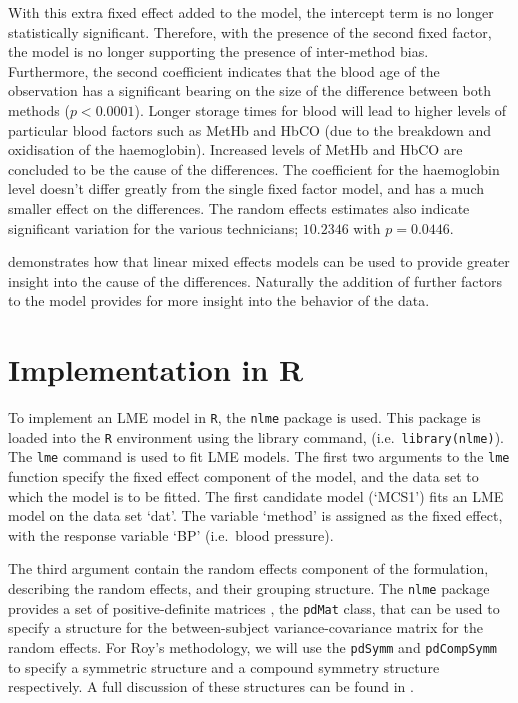 \documentclass[12pt, a4paper]{report}
\theoremstyle{plain}
\theoremstyle{definition}
\theoremstyle{remark}
\begin{document}
With this extra fixed effect added to the model, the intercept
term is no longer statistically significant. Therefore, with the
presence of the second fixed factor, the model is no longer
supporting the presence of inter-method bias. Furthermore, the
second coefficient indicates that the blood age of the observation
has a significant bearing on the size of the difference between
both methods ($p <0.0001$). Longer storage times for blood will
lead to higher levels of particular blood factors such as MetHb
and HbCO (due to the breakdown and oxidisation of the
haemoglobin). Increased levels of MetHb and HbCO are concluded to
be the cause of the differences. The coefficient for the
haemoglobin level doesn't differ greatly from the single fixed
factor model, and has a much smaller effect on the differences.
The random effects estimates also indicate significant variation
for the various technicians; $10.2346$ with $p=0.0446$.

\citet{LaiShiao} demonstrates how that linear mixed effects models
can be used to provide greater insight into the cause of the
differences. Naturally the addition of further factors to the
model provides for more insight into the behavior of the data.






\section{Implementation in R}
To implement an LME model in \texttt{R}, the \texttt{nlme} package is used. This package is loaded into the \texttt{R} environment using the library command, (i.e.\ \texttt{library(nlme)}). The \texttt{lme} command is used to fit LME models. The first two arguments to the \texttt{lme} function specify the fixed effect component of the model, and the data set to which the model is to be fitted. The first candidate model (`MCS1') fits an LME model on the data set `dat'. The variable `method' is assigned as the fixed effect, with the response variable `BP' (i.e.\ blood pressure).

The third argument contain the random effects component of the formulation, describing the random effects, and their grouping structure. The \texttt{nlme} package provides a set of positive-definite matrices , the \texttt{pdMat} class, that can be used to specify a structure for the between-subject variance-covariance matrix for the random effects. For Roy's methodology, we will use the \texttt{pdSymm} and \texttt{pdCompSymm} to specify a symmetric structure and a compound symmetry structure respectively. A full discussion of these structures can be found in \citet[pg. 158]{PB}.
\end{document}
